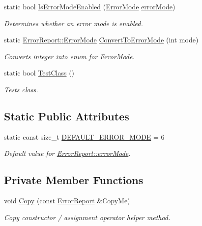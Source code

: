 \begin{DoxyCompactItemize}
static bool \hyperlink{class_error_report_a70c89212f2f6a532f580d80ba89a5c14}{IsErrorModeEnabled} (\hyperlink{class_error_report_ab70777b4cf64240281ddd4217664f683}{ErrorMode} \hyperlink{class_error_report_ab43384b89b5e0b6addcde53268d3c578}{errorMode})
\begin{DoxyCompactList}\small\item\em Determines whether an error mode is enabled. \item\end{DoxyCompactList}\item 
static \hyperlink{class_error_report_ab70777b4cf64240281ddd4217664f683}{ErrorReport::ErrorMode} \hyperlink{class_error_report_aa8fe57ae384da92494bd56ed5e5f66cb}{ConvertToErrorMode} (int mode)
\begin{DoxyCompactList}\small\item\em Converts integer into enum for ErrorMode. \item\end{DoxyCompactList}\item 
static bool \hyperlink{class_error_report_a3372fc11b2256530f284d22a7312c0ac}{TestClass} ()
\begin{DoxyCompactList}\small\item\em Tests class. \item\end{DoxyCompactList}\end{DoxyCompactItemize}
\subsection*{Static Public Attributes}
\begin{DoxyCompactItemize}
\item 
static const size\_\-t \hyperlink{class_error_report_a5dccc8c1af25c623309118b349056ce3}{DEFAULT\_\-ERROR\_\-MODE} = 6
\begin{DoxyCompactList}\small\item\em Default value for \hyperlink{class_error_report_ab43384b89b5e0b6addcde53268d3c578}{ErrorReport::errorMode}. \item\end{DoxyCompactList}\end{DoxyCompactItemize}
\subsection*{Private Member Functions}
\begin{DoxyCompactItemize}
\item 
void \hyperlink{class_error_report_ad3b681a6002d769581ce29f651b63c5e}{Copy} (const \hyperlink{class_error_report}{ErrorReport} \&CopyMe)
\begin{DoxyCompactList}\small\item\em Copy constructor / assignment operator helper method. \item\end{DoxyCompactList}\end{DoxyCompactItemize}
